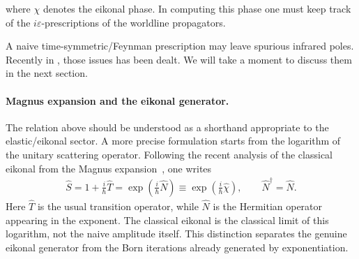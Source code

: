 where \(\chi\) denotes the eikonal phase. In computing this phase one must keep track of the \(i\varepsilon\)-prescriptions of the worldline propagators. {\color{black}A naive time-symmetric/Feynman prescription may leave spurious infrared poles. Recently in \cite{Kim:2024svw}, those issues has been dealt. We will take a moment to discuss them in the next section.
\paragraph{Magnus expansion and the eikonal generator.}
The relation above should be understood as a shorthand appropriate to the elastic/eikonal sector. A more precise formulation starts from the logarithm of the unitary scattering operator. Following the recent analysis of the classical eikonal from the Magnus expansion~\cite{Kim:2024svw}, one writes
\begin{align}
    \widehat S
    =
    1+\frac{i}{\hbar}\widehat T
    =
    \exp\!\left(\frac{i}{\hbar}\widehat N\right)
    \equiv
    \exp\!\left(\frac{i}{\hbar}\widehat\chi\right),
    \qquad
    \widehat N^\dagger=\widehat N .
\end{align}
Here \(\widehat T\) is the usual transition operator, while \(\widehat N\) is the Hermitian operator appearing in the exponent. The classical eikonal is the classical limit of this logarithm, not the naive amplitude itself. This distinction separates the genuine eikonal generator from the Born iterations already generated by exponentiation. 

\begin{figure}[htb!]
\centering
\color{black}
\end{figure}}
